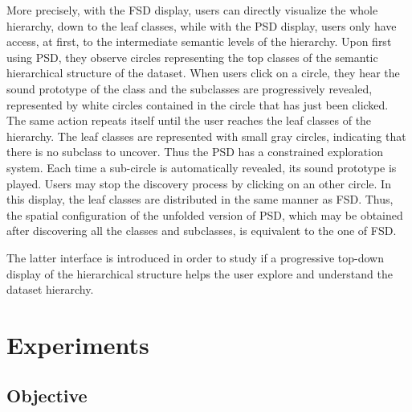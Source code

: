 \documentclass{aes2e}
\begin{document}
More precisely, with the FSD display, users can directly visualize the whole hierarchy, down to the leaf classes, while with the PSD display, users only have access, at first, to the intermediate semantic levels of the hierarchy. Upon first using PSD, they observe circles representing the top classes of the semantic hierarchical structure of the dataset. When users click on a circle, they hear the sound prototype of the class and the subclasses are progressively revealed, represented by white circles contained in the circle that has just been clicked. The same action repeats itself until the user reaches the leaf classes of the hierarchy. The leaf classes are represented with small gray circles, indicating that there is no subclass to uncover. Thus the PSD has a constrained exploration system. Each time a sub-circle is automatically revealed, its sound prototype is played. Users may stop the discovery process by clicking on an other circle. In this display, the leaf classes are distributed  in the same manner as FSD. Thus, the spatial configuration of the unfolded version of PSD, which may be obtained after discovering all the classes and subclasses, is equivalent to the one of FSD.

The latter interface is introduced in order to study if a progressive top-down display of the hierarchical structure helps the user explore and understand the dataset hierarchy.

%

\section{Experiments} \label{test}

\subsection{Objective}
\end{document}
